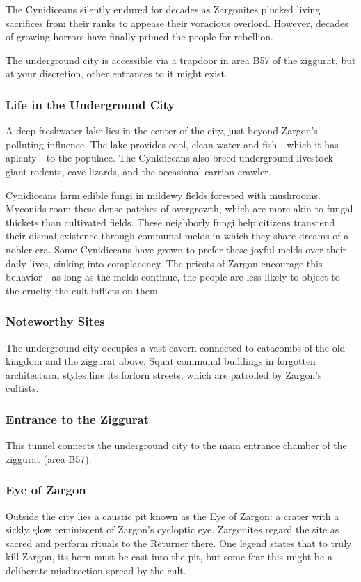 \documentclass[10pt,a4paper,twoside,bg=print,twocolumn,openany,nodeprecatedcode]{dndbook}
\begin{document}
The Cynidiceans silently endured for decades as Zargonites plucked living sacrifices from their ranks to appease their voracious overlord. However, decades of growing horrors have finally primed the people for rebellion.

The underground city is accessible via a trapdoor in area B57 of the ziggurat, but at your discretion, other entrances to it might exist.

\subsubsection{Life in the Underground City}
A deep freshwater lake lies in the center of the city, just beyond Zargon's polluting influence. The lake provides cool, clean water and fish—which it has aplenty—to the populace. The Cynidiceans also breed underground livestock—giant rodents, cave lizards, and the occasional carrion crawler.

Cynidiceans farm edible fungi in mildewy fields forested with mushrooms. Myconids roam these dense patches of overgrowth, which are more akin to fungal thickets than cultivated fields. These neighborly fungi help citizens transcend their dismal existence through communal melds in which they share dreams of a nobler era. Some Cynidiceans have grown to prefer these joyful melds over their daily lives, sinking into complacency. The priests of Zargon encourage this behavior—as long as the melds continue, the people are less likely to object to the cruelty the cult inflicts on them.

\subsubsection{Noteworthy Sites}
The underground city occupies a vast cavern connected to catacombs of the old kingdom and the ziggurat above. Squat communal buildings in forgotten architectural styles line its forlorn streets, which are patrolled by Zargon's cultists.

\subsubsection{Entrance to the Ziggurat}
This tunnel connects the underground city to the main entrance chamber of the ziggurat (area B57).

\subsubsection{Eye of Zargon}
Outside the city lies a caustic pit known as the Eye of Zargon: a crater with a sickly glow reminiscent of Zargon's cycloptic eye. Zargonites regard the site as sacred and perform rituals to the Returner there. One legend states that to truly kill Zargon, its horn must be cast into the pit, but some fear this might be a deliberate misdirection spread by the cult.
\end{document}
